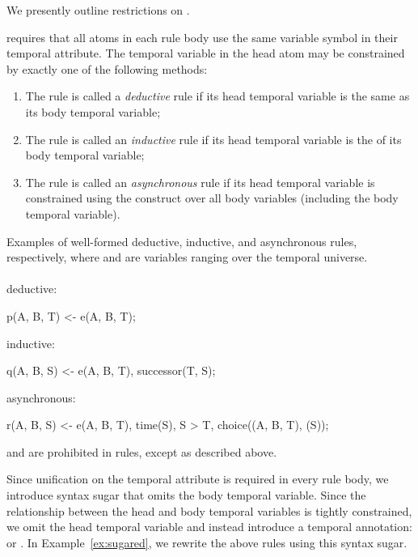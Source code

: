 We presently outline restrictions on \lang.

\vspace{1em}
\lang requires that all atoms in each rule body use the same variable symbol in their temporal attribute.
The temporal variable in the head atom may be constrained by exactly one of the following methods:

\begin{enumerate}
\item The rule is called a {\em deductive} rule if its head temporal variable is the same as its body temporal variable;
\item The rule is called an {\em inductive} rule if its head temporal variable is the  of its body temporal variable;
\item The rule is called an {\em asynchronous} rule if its head temporal variable is constrained using the  construct over all body variables (including the body temporal variable).
\end{enumerate}

\begin{example}
\label{ex:nonsugared}
Examples of well-formed deductive, inductive, and asynchronous rules, respectively, where  and  are variables ranging over the temporal universe.
\\\\
deductive:
\begin{Dedalus}
p(A, B, T) <- e(A, B, T);
\end{Dedalus}
inductive:
\begin{Dedalus}
q(A, B, S) <- e(A, B, T), successor(T, S);
\end{Dedalus}
asynchronous:
\begin{Dedalus}
r(A, B, S) <- e(A, B, T), time(S), S > T,
              choice((A, B, T), (S));
\end{Dedalus}
\end{example}

 and  are prohibited in rules, except as described above.

Since unification on the temporal attribute is required in every rule body,
we introduce syntax sugar that omits the body temporal variable.  Since the relationship between the head and body temporal variables is tightly constrained, we omit the head temporal variable and instead introduce a temporal annotation:  or .  In Example~\ref{ex:sugared}, we rewrite the above rules using this syntax sugar.

